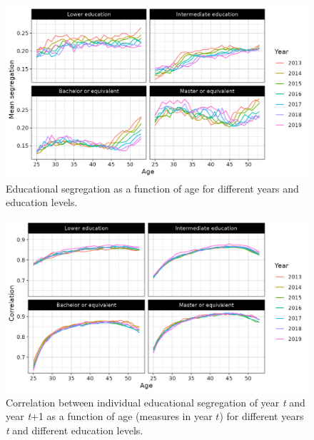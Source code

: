 \documentclass[a4paper,12pt]{article}
\begin{document}
\begin{figure}
  \centering
  \includegraphics[width=\textwidth]{segregatie_naar_leeftijd.png}
  \caption{Educational segregation as a function of age for different years and education levels.}
  \label{fig:lft}
\end{figure}

\begin{figure}
  \centering
  \includegraphics[width=\textwidth]{correlation.png}
  \caption{Correlation between individual educational segregation of year \textit{t} and year \textit{t}+1 as a function of age (measures in year $t$) for different years \textit{t} and different education levels.}
  \label{fig:cor}
\end{figure}
\end{document}
